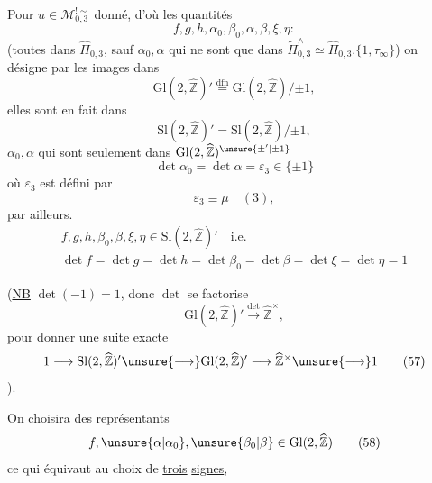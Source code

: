 Pour $u\in\mathcal M_{0,3}^{!\sim}$ donné, d'où les quantités
\[
f,g,h,\alpha_0,\beta_0,\alpha,\beta,\xi,\eta:
\tag{53}
\]
(toutes dans $\widehat{\Pi}_{0,3}$, sauf $\alpha_0,\alpha$ qui ne sont que dans $\widetilde{\Pi}_{0,3}^{\wedge}\simeq\widehat{\Pi}_{0,3}.\{1,\tau_\infty\}$) on désigne par les   images dans 
\[
\mathrm{Gl}(2,\widehat{\mathbb Z})'\stackrel{\mathrm{dfn}}{=}\mathrm{Gl}(2,\widehat{\mathbb Z})/\mathord{\pm}1,
\]
elles sont en fait dans
\[
\mathrm{Sl}(2,\widehat{\mathbb Z})'=\mathrm{Sl}(2,\widehat{\mathbb Z})/\mathord{\pm}1,
\]
 $\alpha_0,\alpha$ qui sont seulement dans $\mathrm{Gl}(2,\widehat{\mathbb Z})^{\unsure{\pm'|\pm1}}$
\[
\det\alpha_0=\det\alpha=\varepsilon_3\in\{\pm1\}
\tag{54}
\]
où $\varepsilon_3$ est défini par
\[
\varepsilon_3\equiv\mu\quad(3),
\tag{55}
\]
 par ailleurs.
\[
\begin{gathered}
f,g,h,\beta_0,\beta,\xi,\eta\in\mathrm{Sl}(2,\widehat{\mathbb Z})'\quad\text{i.e.}\\
\det f=\det g=\det h=\det\beta_0=\det\beta=\det\xi=\det\eta=1
\end{gathered}
\tag{56}
\]

(\uline{NB}   $\det(-1)=1$, donc $\det$ se factorise
\[
\mathrm{Gl}(2,\widehat{\mathbb Z})'\xrightarrow{\det}\widehat{\mathbb Z}^{\times},
\]
pour donner une suite exacte
\[
1\longrightarrow\mathrm{Sl}(2,\widehat{\mathbb Z})'\unsure{\longrightarrow}\mathrm{Gl}(2,\widehat{\mathbb Z})'\longrightarrow\widehat{\mathbb Z}^{\times}\unsure{\longrightarrow}1
\tag{57}
\]
).

On choisira des représentants
\[
f,\unsure{\alpha|\alpha_0},\unsure{\beta_0|\beta}\in\mathrm{Gl}(2,\widehat{\mathbb Z})
\tag{58}
\]
ce qui équivaut au choix de \uline{trois} \uline{signes},

